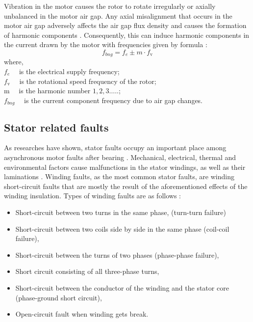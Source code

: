 Vibration in the motor causes the rotor to rotate irregularly or axially unbalanced in the motor air gap. Any axial misalignment that occurs in the motor air gap adversely affects the air gap flux density and causes the formation of harmonic components \cite{schoen1995motor,en201320958,faiz2017fault}. Consequently, this can induce harmonic components in the current drawn by the motor with frequencies given by formula \cite{schoen1995motor}:
\begin{equation}
	f_{bng}=f_{e} \pm m \cdot f_{\mathrm{v}}
	\label{bearingfault}
\end{equation}
where,\\
$f_{e} \quad$ is the electrical supply frequency;\\
$f_{\mathrm{v}} \quad$ is the rotational speed frequency of the rotor;\\
$\mathrm{m} \quad$ is the harmonic number $1,2,3 \ldots$..;\\
$f_{bng} \quad$ is the current component frequency due to air gap changes.

\subsection{Stator related faults}

As researches have shown, stator faults occupy an important place among asynchronous motor faults after bearing \cite{motor1985report,albrecht1986assessment,albrecht1987assessment,thorsen1995survey,bonnett2008increased}. Mechanical, electrical, thermal and environmental factors cause malfunctions in the stator windings, as well as their laminations \cite{karmakar2016induction,Siddique}. Winding faults, as the most common stator faults, are winding short-circuit faults that are mostly the result of the aforementioned effects of the winding insulation. Types of winding faults are as follows \cite{karmakar2016induction,Siddique,lipo}:

\begin{itemize}
	\item Short-circuit between two turns in the same phase, (turn-turn failure)
	\item Short-circuit between two coils side by side in the same phase (coil-coil failure),
	\item Short-circuit between the turns of two phases (phase-phase failure),
	\item Short circuit consisting of all three-phase turns,
	\item Short-circuit between the conductor of the winding and the stator core (phase-ground short circuit),
	\item Open-circuit fault when winding gets break.
\end{itemize}

